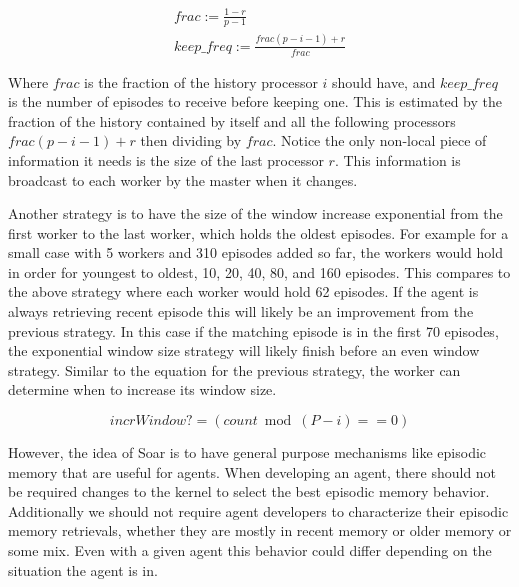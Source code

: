\documentclass[11pt]{article} %
\begin{document}
\begin{equation}
\begin{split}
frac := \frac{1-r}{p-1} \\
keep\_freq := \frac{frac(p - i -1) + r}{frac}
\end{split}
\end{equation}

Where $frac$ is the fraction of the history processor $i$ should have, and $keep\_freq$
is the number of episodes to receive before keeping one. This is estimated by the fraction
of the history contained by itself and all the following processors $frac(p - i - 1) + r$ then 
dividing by $frac$. Notice the only non-local piece of information it needs is the
size of the last processor $r$. This information is broadcast to each worker 
by the master when it changes. 

Another strategy is to have the size of the window increase exponential from the
first worker to the last worker, which holds the oldest episodes. For example
for a small case with 5 workers and 310 episodes added so far, the workers would
hold in order for youngest to oldest, 10, 20, 40, 80, and 160 episodes. This
compares to the above strategy where each worker would hold 62 episodes. If the
agent is always retrieving recent episode this will likely be an improvement
from the previous strategy. In this case if the matching episode is in the first
70 episodes, the exponential window size strategy will likely finish before an
even window strategy. Similar to the equation for the previous strategy, the
worker can determine when to increase its window size.

\begin{equation}incrWindow? = (count  \bmod  (P-i)  == 0)\label{eq.1}\end{equation}

However, the idea of Soar is to have general purpose mechanisms like episodic
memory that are useful for agents. When developing an agent, there should not be
required changes to the kernel to select the best episodic memory behavior.
Additionally we should not require agent developers to characterize their
episodic memory retrievals, whether they are mostly in recent memory or older
memory or some mix. Even with a given agent this behavior could differ depending
on the situation the agent is in.
\end{document}
